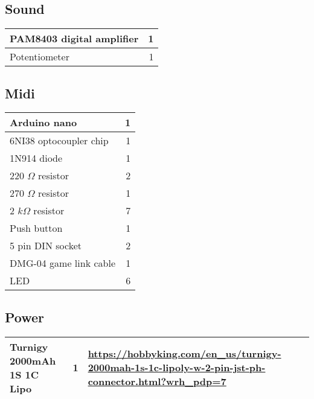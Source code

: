 \documentclass{article}
\begin{document}
\subsection{Sound}
\begin{tabular}{p{5cm} r}

        \hline PAM8403 digital amplifier & 1 \\
        \hline Potentiometer & 1 \\
        \hline 
        
\end{tabular}

\subsection{Midi}

\begin{tabular}{p{5cm} r}

        \hline Arduino nano & 1 \\
        \hline 6NI38 optocoupler chip & 1 \\
        \hline 1N914 diode & 1 \\
        \hline 220 $\Omega$ resistor & 2 \\
        \hline 270 $\Omega$ resistor & 1 \\
        \hline 2 $k\Omega$ resistor & 7 \\
        \hline Push button & 1 \\
        \hline 5 pin DIN socket & 2 \\
        \hline DMG-04 game link cable & 1 \\
        \hline LED & 6 \\
        \hline

\end{tabular}

\subsection{Power}

\begin{tabular}{p{5cm} r p{8cm}}

        \hline Turnigy 2000mAh 1S 1C Lipo & 1 & \url{https://hobbyking.com/en_us/turnigy-2000mah-1s-1c-lipoly-w-2-pin-jst-ph-connector.html?wrh_pdp=7} \\
        \hline 

\end{tabular}
\end{document}
